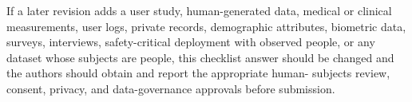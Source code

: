 If a later revision adds a user study, human-generated data, medical or
clinical measurements, user logs, private records, demographic attributes,
biometric data, surveys, interviews, safety-critical deployment with observed
people, or any dataset whose subjects are people, this checklist answer should
be changed and the authors should obtain and report the appropriate human-
subjects review, consent, privacy, and data-governance approvals before
submission.

